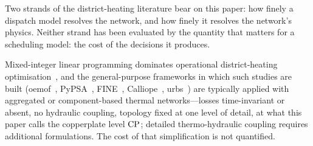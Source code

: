 
Two strands of the district-heating literature bear on this paper: how finely a
dispatch model resolves the network, and how finely it resolves the network's physics.
Neither strand has been evaluated by the quantity that matters for a scheduling model:
the cost of the decisions it produces.

Mixed-integer linear programming dominates operational district-heating
optimisation~\cite{Fang2016}, and the general-purpose frameworks in which such studies are
built (oemof~\cite{Hilpert2018_oemof}, PyPSA~\cite{Brown2018_pypsa},
FINE~\cite{Welder2018_FINE}, Calliope~\cite{Pfenninger2018_calliope},
urbs~\cite{Dorfner2016_urbs}) are typically applied with aggregated or component-based
thermal networks---losses time-invariant or absent, no hydraulic coupling, topology fixed at
one level of detail, at what this paper calls the copperplate level $\mathrm{CP}$; detailed
thermo-hydraulic coupling requires additional formulations. The cost of that simplification
is not quantified.

